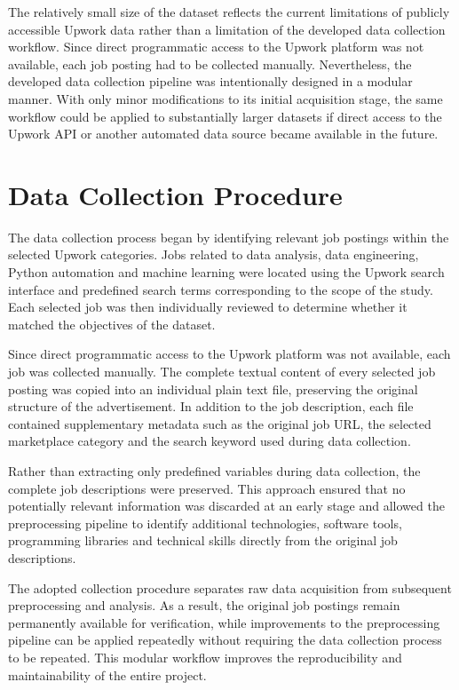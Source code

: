The relatively small size of the dataset reflects the current limitations of publicly accessible Upwork data rather than a limitation of
the developed data collection workflow. Since direct programmatic access to the Upwork platform was not available, each job posting had to be collected manually.
Nevertheless, the developed data collection pipeline was intentionally designed in a modular manner. With only minor modifications to
its initial acquisition stage, the same workflow could be applied to substantially larger datasets if direct access to the Upwork API or
another automated data source became available in the future.

\section{Data Collection Procedure}

The data collection process began by identifying relevant job postings within the selected Upwork categories. Jobs related to data analysis,
data engineering, Python automation and machine learning were located using the Upwork search interface and predefined search terms corresponding to
the scope of the study. Each selected job was then individually reviewed to determine whether it matched the objectives of the dataset.

Since direct programmatic access to the Upwork platform was not available, each job was collected manually. The complete textual content of
every selected job posting was copied into an individual plain text file, preserving the original structure of the advertisement.
In addition to the job description, each file contained supplementary metadata such as the original job URL, the selected marketplace category
and the search keyword used during data collection.

Rather than extracting only predefined variables during data collection, the complete job descriptions were preserved.
This approach ensured that no potentially relevant information was discarded at an early stage and allowed the preprocessing pipeline to
identify additional technologies, software tools, programming libraries and technical skills directly from the original job descriptions.

The adopted collection procedure separates raw data acquisition from subsequent preprocessing and analysis. As a result, the original job postings
remain permanently available for verification, while improvements to the preprocessing pipeline can be applied repeatedly without
requiring the data collection process to be repeated. This modular workflow improves the reproducibility and maintainability of the entire project.

